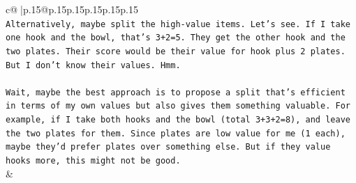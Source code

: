 \documentclass{article}
\begin{document}
{\begin{supertabular}{c@{$\;$}|p{.15\linewidth}@{}p{.15\linewidth}p{.15\linewidth}p{.15\linewidth}p{.15\linewidth}p{.15\linewidth}}
{{{\\ 
\texttt{Alternatively, maybe split the high{-}value items. Let's see. If I take one hook and the bowl, that's 3+2=5. They get the other hook and the two plates. Their score would be their value for hook plus 2 plates. But I don't know their values. Hmm.} \\
\\ 
\texttt{Wait, maybe the best approach is to propose a split that's efficient in terms of my own values but also gives them something valuable. For example, if I take both hooks and the bowl (total 3+3+2=8), and leave the two plates for them. Since plates are low value for me (1 each), maybe they'd prefer plates over something else. But if they value hooks more, this might not be good.} \\
            }
        }
    }
    & \\ \\


\end{supertabular}}
\end{document}
